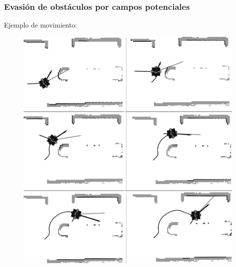 \begin{frame}\frametitle{Evasión de obstáculos por campos potenciales}
  Ejemplo de movimiento:
  \begin{figure}
    \centering
    \includegraphics[height=0.85\textheight]{Figures/MotionPlanning/PotFieldsExecution.png}
  \end{figure}
\end{frame}

